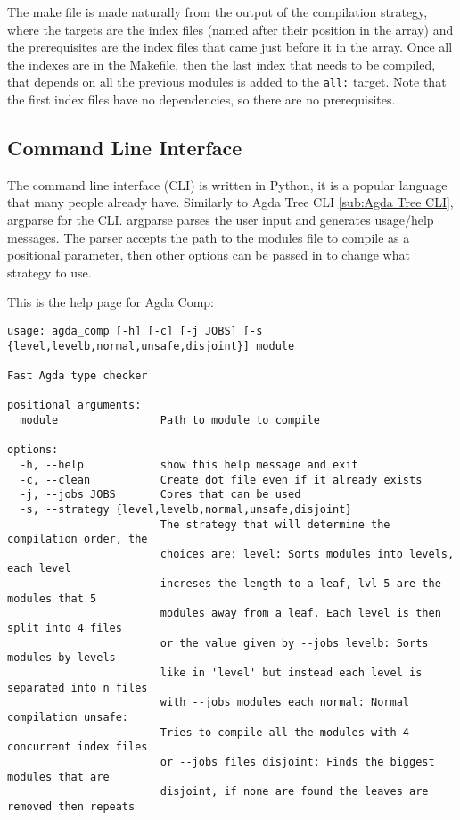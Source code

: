 The make file is made naturally from the output of the compilation strategy,
where the targets are the index files (named after their position in the array)
and the prerequisites are the index files that came just before it in the
array. Once all the indexes are in the Makefile, then the last index that needs
to be compiled, that depends on all the previous modules is added to the
\texttt{all:} target. Note that the first index files have no dependencies, so
there are no prerequisites.


\subsection{Command Line Interface}

The command line interface (CLI) is written in Python, it is a popular language
that many people already have. Similarly to Agda Tree CLI \cref{sub:Agda Tree
CLI}, argparse for the CLI. argparse parses the user input and generates
usage/help messages. The parser accepts the path to the modules file to compile
as a positional parameter, then other options can be passed in to change what
strategy to use.

This is the help page for Agda Comp:
\begin{lstlisting}
usage: agda_comp [-h] [-c] [-j JOBS] [-s {level,levelb,normal,unsafe,disjoint}] module

Fast Agda type checker

positional arguments:
  module                Path to module to compile

options:
  -h, --help            show this help message and exit
  -c, --clean           Create dot file even if it already exists
  -j, --jobs JOBS       Cores that can be used
  -s, --strategy {level,levelb,normal,unsafe,disjoint}
                        The strategy that will determine the compilation order, the
                        choices are: level: Sorts modules into levels, each level
                        increses the length to a leaf, lvl 5 are the modules that 5
                        modules away from a leaf. Each level is then split into 4 files
                        or the value given by --jobs levelb: Sorts modules by levels
                        like in 'level' but instead each level is separated into n files
                        with --jobs modules each normal: Normal compilation unsafe:
                        Tries to compile all the modules with 4 concurrent index files
                        or --jobs files disjoint: Finds the biggest modules that are
                        disjoint, if none are found the leaves are removed then repeats
\end{lstlisting}

